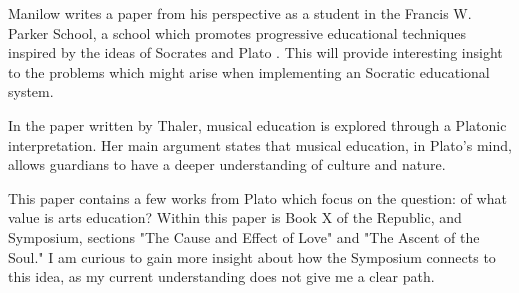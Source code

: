 \documentclass[titlepage]{article}
\begin{document}
Manilow writes a paper from his perspective as a student in the Francis W. Parker School, a school which promotes progressive educational techniques inspired by the ideas of Socrates and Plato \cite{Manilow2009}. This will provide interesting insight to the problems which might arise when implementing an Socratic educational system.

In the paper written by Thaler, musical education is explored through a Platonic interpretation. Her main argument states that musical education, in Plato's mind, allows guardians to have a deeper understanding of culture and nature. \cite{Thaler2015}

This paper contains a few works from Plato which focus on the question: of what value is arts education? Within this paper is Book X of the Republic, and Symposium, sections "The Cause and Effect of Love" and "The Ascent of the Soul." I am curious to gain more insight about how the Symposium connects to this idea, as my current understanding does not give me a clear path. \cite{Plato2002}




\end{document}
